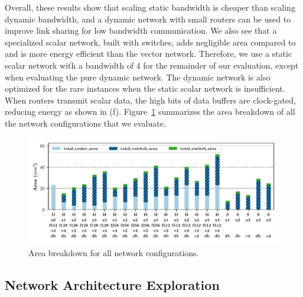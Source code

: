 Overall, these results show that scaling static bandwidth is cheaper than scaling dynamic bandwidth, and a dynamic network with small routers can be used to improve link sharing for low bandwidth communication.  
We also see that a specialized scalar network, built with switches, adds negligible area compared to and is more energy efficient than the vector network. 
Therefore, we use a static scalar network with a bandwidth of 4 for the remainder of our evaluation, except when evaluating the pure dynamic network.
The dynamic network is also optimized for the rare instances when the static scalar network is insufficient. 
When routers transmit scalar data, the high bits of data buffers are clock-gated, reducing energy as shown in (f).
Figure~\ref{fig:area} summarizes the area breakdown of all the network configurations that we evaluate.

\begin{figure}
\centering
\includegraphics[width=1\columnwidth]{figs/area.pdf}
  \caption{Area breakdown for all network configurations.}\label{fig:area}
\end{figure}

\subsection{Network Architecture Exploration} \label{sec:net_dse}

